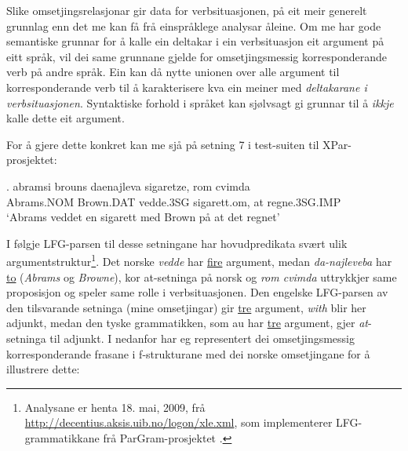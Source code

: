 \documentclass[11pt,a4paper,oneside,draft]{book}
\begin{document}
Slike omsetjingsrelasjonar gir data for verbsituasjonen, på eit meir
generelt grunnlag enn det me kan få frå einspråklege analysar
åleine. Om me har gode semantiske grunnar for å kalle ein deltakar i
ein verbsituasjon eit argument på eitt språk, vil dei same grunnane
gjelde for omsetjingsmessig korresponderande verb på andre språk. Ein
kan då nytte unionen over alle argument til korresponderande verb til
å karakterisere kva ein meiner med \emph{deltakarane i verbsituasjonen}. Syntaktiske forhold i språket kan sjølvsagt gi
grunnar til å \emph{ikkje} kalle dette eit argument.
 
For å gjere dette konkret kan me sjå på setning 7 i test-suiten til
XPar-prosjektet:

\exg.  abramsi brouns       daenajleva sigaretze, rom cvimda \\
      Abrams.NOM Brown.DAT vedde.3SG sigarett.om, at  regne.3SG.IMP \\
     `Abrams veddet en sigarett med Brown på at det regnet' 

I følgje LFG-parsen til desse setningane har hovudpredikata svært ulik
argumentstruktur\footnote{Analysane er henta 18. mai, 2009, frå
        \href{http://decentius.aksis.uib.no/logon/xle.xml}{http://decentius.aksis.uib.no/logon/xle.xml}, som implementerer
        LFG-grammatikkane frå ParGram-prosjektet \citep{butt2002pgp}. }. Det norske \emph{vedde} har \underline{fire} argument, medan
\emph{da-najleveba} har \underline{to} (\emph{Abrams} og \emph{Browne}), kor at-setninga på
norsk og \emph{rom cvimda} uttrykkjer same proposisjon og speler same rolle
i verbsituasjonen. Den engelske LFG-parsen av den tilsvarande setninga
(mine omsetjingar) gir \underline{tre} argument, \emph{with} blir her adjunkt, medan
den tyske grammatikken, som au har \underline{tre} argument, gjer \emph{at}-setninga
til adjunkt. I \Next nedanfor har eg representert dei omsetjingsmessig
korresponderande frasane i f-strukturane med dei norske omsetjingane
for å illustrere dette:
\end{document}
